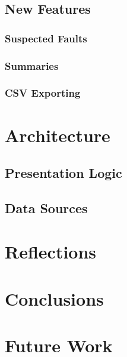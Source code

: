\documentclass{article}
\begin{document}
\subsection{New Features}
\subsubsection{Suspected Faults}
\subsubsection{Summaries}
\subsubsection{CSV Exporting}

\section{Architecture}
\subsection{Presentation Logic}
\subsection{Data Sources}
\section{Reflections}
\section{Conclusions}

\section{Future Work}



\end{document}
